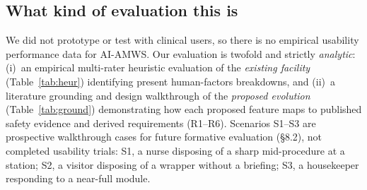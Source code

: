 \documentclass[10pt,twocolumn,a4paper]{article}
\newcommand{\tabref}[1]{Table~\ref{#1}}
\begin{document}
\subsection{What kind of evaluation this is}
We did not prototype or test with clinical users, so there is no empirical usability performance data for AI-AMWS. Our evaluation is twofold and strictly \emph{analytic}: (i)~an empirical multi-rater heuristic evaluation of the \emph{existing facility} (\tabref{tab:heur}) identifying present human-factors breakdowns, and (ii)~a literature grounding and design walkthrough of the \emph{proposed evolution} (\tabref{tab:ground}) demonstrating how each proposed feature maps to published safety evidence and derived requirements (R1--R6). Scenarios S1--S3 are prospective walkthrough cases for future formative evaluation (\S8.2), not completed usability trials: S1, a nurse disposing of a sharp mid-procedure at a station; S2, a visitor disposing of a wrapper without a briefing; S3, a housekeeper responding to a near-full module.
\end{document}
